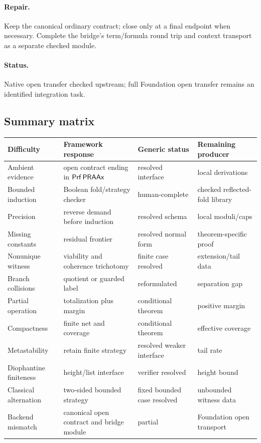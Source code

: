 \paragraph{Repair.}
Keep the canonical ordinary contract; close only at a final endpoint when necessary.  Complete the bridge's term/formula round trip and context transport as a separate checked module.

\paragraph{Status.}
Native open transfer checked upstream; full Foundation open transfer remains an identified integration task.

\subsection{Summary matrix}

\begin{longtable}{@{}p{}p{}p{}p{}@{}}
\toprule
Difficulty & Framework response & Generic status & Remaining producer \\
\midrule
Ambient evidence & open contract ending in \(\mathsf{Prf}\,\mathsf{PRAAx}\) & resolved interface & local derivations \\
Bounded induction & Boolean fold/strategy checker & human-complete & checked reflected-fold library \\
Precision & reverse demand before induction & resolved schema & local moduli/caps \\
Missing constants & residual frontier & resolved normal form & theorem-specific proof \\
Nonunique witness & viability and coherence trichotomy & finite case resolved & extension/tail data \\
Branch collisions & quotient or guarded label & reformulated & separation gap \\
Partial operation & totalization plus margin & conditional theorem & positive margin \\
Compactness & finite net and coverage & conditional theorem & effective coverage \\
Metastability & retain finite strategy & resolved weaker interface & tail rate \\
Diophantine finiteness & height/list interface & verifier resolved & height bound \\
Classical alternation & two-sided bounded strategy & fixed bounded case resolved & unbounded witness data \\
Backend mismatch & canonical open contract and bridge module & partial & Foundation open transport \\
\bottomrule
\end{longtable}
